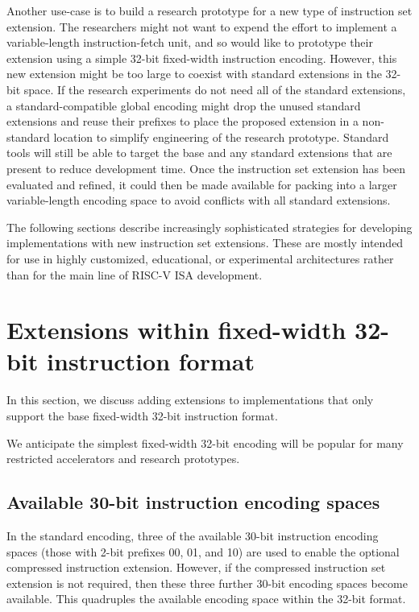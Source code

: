 Another use-case is to build a research prototype for a new type of
instruction set extension.  The researchers might not want to expend
the effort to implement a variable-length instruction-fetch unit, and
so would like to prototype their extension using a simple 32-bit
fixed-width instruction encoding.  However, this new extension might
be too large to coexist with standard extensions in the 32-bit space.
If the research experiments do not need all of the standard
extensions, a standard-compatible global encoding might drop the
unused standard extensions and reuse their prefixes to place the
proposed extension in a non-standard location to simplify engineering
of the research prototype.  Standard tools will still be able to
target the base and any standard extensions that are present to reduce
development time.  Once the instruction set extension has been
evaluated and refined, it could then be made available for packing
into a larger variable-length encoding space to avoid conflicts with
all standard extensions.

The following sections describe increasingly sophisticated strategies
for developing implementations with new instruction set extensions.
These are mostly intended for use in highly customized, educational,
or experimental architectures rather than for the main line of RISC-V
ISA development.

\section{Extensions within fixed-width 32-bit instruction format}
\label{fix32b}

In this section, we discuss adding extensions to implementations that
only support the base fixed-width 32-bit instruction format.

\begin{commentary}
We anticipate the simplest fixed-width 32-bit encoding will be popular for
many restricted accelerators and research prototypes.
\end{commentary}

\subsection*{Available 30-bit instruction encoding spaces}

In the standard encoding, three of the available 30-bit instruction
encoding spaces (those with 2-bit prefixes 00, 01, and 10) are used to
enable the optional compressed instruction extension.  However, if the
compressed instruction set extension is not required, then these three
further 30-bit encoding spaces become available.  This quadruples the
available encoding space within the 32-bit format.

